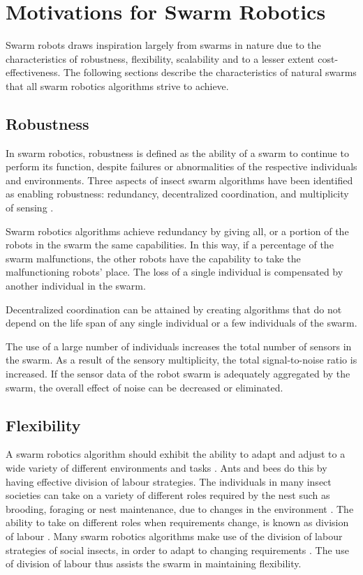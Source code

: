 \section{Motivations for Swarm Robotics}
\label{motivations}

Swarm robots draws inspiration largely from swarms in nature due to the characteristics of robustness, flexibility, scalability and to a lesser extent cost-effectiveness. The following sections describe the characteristics of natural swarms that all swarm robotics algorithms strive to achieve. 

\subsection{Robustness}
\label{robustness}


In swarm robotics, robustness is defined as the ability of a swarm to continue to perform its function, despite failures or abnormalities of the respective individuals and environments. Three aspects of insect swarm algorithms have been identified as enabling robustness: redundancy, decentralized coordination, and multiplicity of sensing \cite{csahin2005swarm}. 

Swarm robotics algorithms achieve redundancy by giving all, or a portion of the robots in the swarm the same capabilities. In this way, if a percentage of the swarm malfunctions, the other robots have the capability to take the malfunctioning robots' place. The loss of a single individual is compensated by another individual in the swarm.

Decentralized coordination can be attained by creating algorithms that do not depend on the life span of any single individual or a few individuals of the swarm.

The use of a large number of individuals increases the total number of sensors in the swarm. As a result of the sensory multiplicity, the total signal-to-noise ratio is increased. If the sensor data of the robot swarm is adequately aggregated by the swarm, the overall effect of noise can be decreased or eliminated. 

\subsection{Flexibility}
\label{flexibility}

A swarm robotics algorithm should exhibit the ability to adapt and adjust to a wide variety of different environments and tasks \cite{brambilla2013swarm}. Ants and bees do this by having effective division of labour strategies. The individuals in many insect societies can take on a variety of different roles required by the nest such as brooding, foraging or nest maintenance, due to changes in the environment \cite{morley1946division}. The ability to take on different roles when requirements change, is known as division of labour \cite{beshers2001models}. Many swarm robotics algorithms make use of the division of labour strategies of social insects, in order to adapt to changing requirements  \cite{gerkey2004formal, labella2006division, liu2007towards}. The use of division of labour thus assists the swarm in maintaining flexibility.

